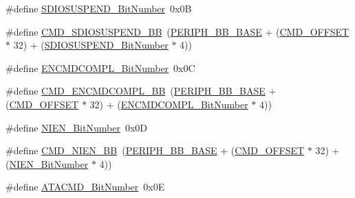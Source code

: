 \begin{DoxyCompactItemize}
\#define \mbox{\hyperlink{group___s_d_i_o___private___types_definitions_gaf88f03a42d76974b55dfb8bda65ade97}{S\+D\+I\+O\+S\+U\+S\+P\+E\+N\+D\+\_\+\+Bit\+Number}}~0x0B
\item 
\#define \mbox{\hyperlink{group___s_d_i_o___private___types_definitions_ga931e48aa282e2a937308f57f807e0781}{C\+M\+D\+\_\+\+S\+D\+I\+O\+S\+U\+S\+P\+E\+N\+D\+\_\+\+BB}}~(\mbox{\hyperlink{group___peripheral__memory__map_gaed7efc100877000845c236ccdc9e144a}{P\+E\+R\+I\+P\+H\+\_\+\+B\+B\+\_\+\+B\+A\+SE}} + (\mbox{\hyperlink{group___s_d_i_o___private___types_definitions_gaf12d26702ce7a88d2a3dae87f000b75e}{C\+M\+D\+\_\+\+O\+F\+F\+S\+ET}} $\ast$ 32) + (\mbox{\hyperlink{group___s_d_i_o___private___types_definitions_gaf88f03a42d76974b55dfb8bda65ade97}{S\+D\+I\+O\+S\+U\+S\+P\+E\+N\+D\+\_\+\+Bit\+Number}} $\ast$ 4))
\item 
\#define \mbox{\hyperlink{group___s_d_i_o___private___types_definitions_ga1d1112c7b804791a0fffd8b317085aeb}{E\+N\+C\+M\+D\+C\+O\+M\+P\+L\+\_\+\+Bit\+Number}}~0x0C
\item 
\#define \mbox{\hyperlink{group___s_d_i_o___private___types_definitions_gade06098d1616639ce5f1b70675280b7c}{C\+M\+D\+\_\+\+E\+N\+C\+M\+D\+C\+O\+M\+P\+L\+\_\+\+BB}}~(\mbox{\hyperlink{group___peripheral__memory__map_gaed7efc100877000845c236ccdc9e144a}{P\+E\+R\+I\+P\+H\+\_\+\+B\+B\+\_\+\+B\+A\+SE}} + (\mbox{\hyperlink{group___s_d_i_o___private___types_definitions_gaf12d26702ce7a88d2a3dae87f000b75e}{C\+M\+D\+\_\+\+O\+F\+F\+S\+ET}} $\ast$ 32) + (\mbox{\hyperlink{group___s_d_i_o___private___types_definitions_ga1d1112c7b804791a0fffd8b317085aeb}{E\+N\+C\+M\+D\+C\+O\+M\+P\+L\+\_\+\+Bit\+Number}} $\ast$ 4))
\item 
\#define \mbox{\hyperlink{group___s_d_i_o___private___types_definitions_gab6d83a7ccd4a0d9ea9a09fec263fb25f}{N\+I\+E\+N\+\_\+\+Bit\+Number}}~0x0D
\item 
\#define \mbox{\hyperlink{group___s_d_i_o___private___types_definitions_ga08623f1d053677de8b20a6f5f5090edd}{C\+M\+D\+\_\+\+N\+I\+E\+N\+\_\+\+BB}}~(\mbox{\hyperlink{group___peripheral__memory__map_gaed7efc100877000845c236ccdc9e144a}{P\+E\+R\+I\+P\+H\+\_\+\+B\+B\+\_\+\+B\+A\+SE}} + (\mbox{\hyperlink{group___s_d_i_o___private___types_definitions_gaf12d26702ce7a88d2a3dae87f000b75e}{C\+M\+D\+\_\+\+O\+F\+F\+S\+ET}} $\ast$ 32) + (\mbox{\hyperlink{group___s_d_i_o___private___types_definitions_gab6d83a7ccd4a0d9ea9a09fec263fb25f}{N\+I\+E\+N\+\_\+\+Bit\+Number}} $\ast$ 4))
\item 
\#define \mbox{\hyperlink{group___s_d_i_o___private___types_definitions_gabd4fd3bb700b879f843ccc867db1832e}{A\+T\+A\+C\+M\+D\+\_\+\+Bit\+Number}}~0x0E

\end{DoxyCompactItemize}
